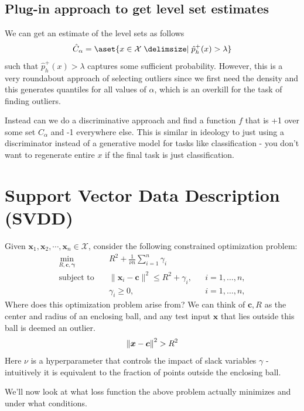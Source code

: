 \documentclass[11pt]{report}
\begin{document}
\subsection{Plug-in approach to get level set estimates}
We can get an estimate of the level sets as follows 
\begin{align}
    \hat{C}_\alpha = \aset{x \in \mathcal{X} \suchthat \hat{p}_h^+(x) > \lambda}
\end{align} such that $\hat{p}_h^+(x) > \lambda$ captures some sufficient probability. However, this is a very roundabout approach of selecting outliers since we first need the density and this generates quantiles for all values of $\alpha$, which is an overkill for the task of finding outliers. 

Instead can we do a discriminative approach and find a function $f$ that is +1
over some set $C_\alpha$ and -1 everywhere else. This is similar in ideology to
just using a discriminator instead of a generative model for tasks like
classification - you don't want to regenerate entire $x$ if the final task is
just classification.

\section{Support Vector Data Description (SVDD)}
Given $\mathbf{x}_1, \mathbf{x}_2, \cdots, \mathbf{x}_n \in \mathcal{X}$, consider the following constrained optimization problem:
\begin{align}
\min_{R, \mathbf{c}, \boldsymbol{\gamma}} \quad & R^2 + \frac{1}{\nu n} \sum_{i=1}^{n} \gamma_i \\
\text{subject to} \quad & \|\mathbf{x}_i - \mathbf{c} \|^2 \leq R^2 + \gamma_i, 
&& i = 1, \ldots, n, \label{svdd-const1} \\
& \gamma_i \geq 0, 
&& i = 1, \ldots, n, \label{svdd-const2}
\end{align}
 Where does this optimization problem arise from? We can think of $\boldsymbol{c}, R$ as the center and radius of an enclosing ball, and any test input $\boldsymbol{x}$ that lies outside this ball is deemed an outlier. 
$$\left\lVert \boldsymbol{x} - \boldsymbol{c} \right\rVert^2 > R^2$$ Here $\nu$ is a
hyperparameter that controls the impact of slack variables $\gamma$ -
intuitively it is equivalent to the fraction of points outside the enclosing
ball. 

We'll now look at what loss function the above problem actually minimizes and under what conditions. 
\end{document}
